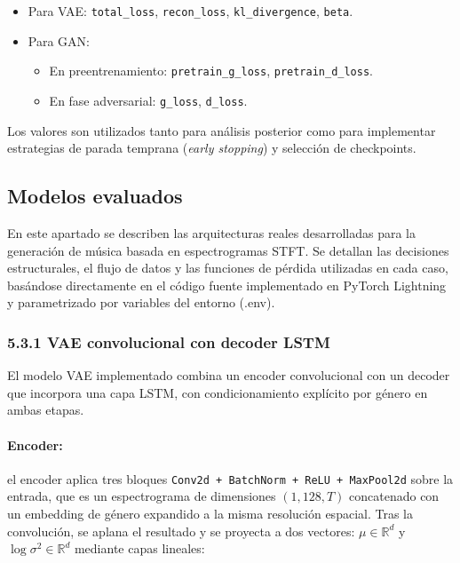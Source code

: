 \begin{itemize}
    \item Para VAE: \texttt{total\_loss}, \texttt{recon\_loss}, \texttt{kl\_divergence}, \texttt{beta}.
    \item Para GAN:
        \begin{itemize}
            \item En preentrenamiento: \texttt{pretrain\_g\_loss}, \texttt{pretrain\_d\_loss}.
            \item En fase adversarial: \texttt{g\_loss}, \texttt{d\_loss}.
        \end{itemize}
\end{itemize}

Los valores son utilizados tanto para análisis posterior como para implementar estrategias de parada temprana (\textit{early stopping}) y selección de checkpoints.



\subsection{Modelos evaluados}

En este apartado se describen las arquitecturas reales desarrolladas para la generación de música basada en espectrogramas STFT. Se detallan las decisiones estructurales, el flujo de datos y las funciones de pérdida utilizadas en cada caso, basándose directamente en el código fuente implementado en PyTorch Lightning y parametrizado por variables del entorno (.env).

\subsubsection*{5.3.1 VAE convolucional con decoder LSTM}

El modelo VAE implementado combina un encoder convolucional con un decoder que incorpora una capa LSTM, con condicionamiento explícito por género en ambas etapas.

\paragraph{Encoder:} el encoder aplica tres bloques \texttt{Conv2d + BatchNorm + ReLU + MaxPool2d} sobre la entrada, que es un espectrograma de dimensiones $(1, 128, T)$ concatenado con un embedding de género expandido a la misma resolución espacial. Tras la convolución, se aplana el resultado y se proyecta a dos vectores: $\mu \in \mathbb{R}^{d}$ y $\log\sigma^2 \in \mathbb{R}^{d}$ mediante capas lineales:

